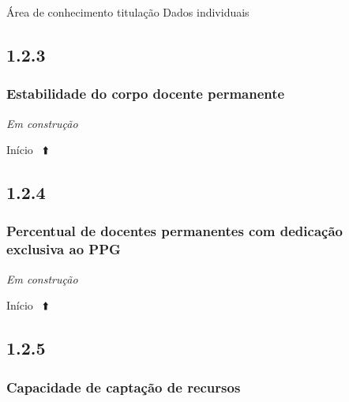 \documentclass[
  a4paper,
]{book}
\begin{document}
Área de conhecimento titulação \textbar{} Dados individuais

\hypertarget{section-5}{%
\subsection{\texorpdfstring{\textbf{1.2.3}}{1.2.3}}\label{section-5}}

\hypertarget{estabilidade-do-corpo-docente-permanente}{%
\subsubsection{\texorpdfstring{\textbf{Estabilidade do corpo docente permanente}}{Estabilidade do corpo docente permanente}}\label{estabilidade-do-corpo-docente-permanente}}

\emph{Em construção}

Início ~⬆️

\hypertarget{section-6}{%
\subsection{\texorpdfstring{\textbf{1.2.4}}{1.2.4}}\label{section-6}}

\hypertarget{percentual-de-docentes-permanentes-com-dedicauxe7uxe3o-exclusiva-ao-ppg}{%
\subsubsection{\texorpdfstring{\textbf{Percentual de docentes permanentes com dedicação exclusiva ao PPG}}{Percentual de docentes permanentes com dedicação exclusiva ao PPG}}\label{percentual-de-docentes-permanentes-com-dedicauxe7uxe3o-exclusiva-ao-ppg}}

\emph{Em construção}

Início ~⬆️

\hypertarget{section-7}{%
\subsection{\texorpdfstring{\textbf{1.2.5}}{1.2.5}}\label{section-7}}

\hypertarget{capacidade-de-captauxe7uxe3o-de-recursos}{%
\subsubsection{\texorpdfstring{\textbf{Capacidade de captação de recursos}}{Capacidade de captação de recursos}}\label{capacidade-de-captauxe7uxe3o-de-recursos}}
\end{document}
